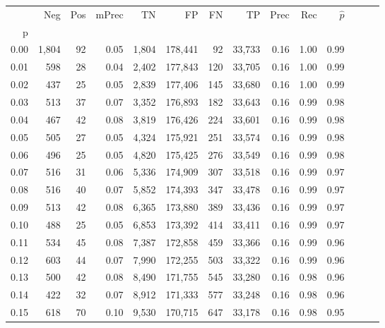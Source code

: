\begin{tabular}{rrrrrrrrrrrrrr}
\toprule
{} &    Neg &    Pos & mPrec &       TN &       FP &      FN &      TP &  Prec &   Rec & $\hat{p}$ \\
p    &        &        &       &          &          &         &         &       &       &           \\
\midrule
0.00 &  1,804 &     92 &  0.05 &    1,804 &  178,441 &      92 &  33,733 &  0.16 &  1.00 &      0.99 \\
0.01 &    598 &     28 &  0.04 &    2,402 &  177,843 &     120 &  33,705 &  0.16 &  1.00 &      0.99 \\
0.02 &    437 &     25 &  0.05 &    2,839 &  177,406 &     145 &  33,680 &  0.16 &  1.00 &      0.99 \\
0.03 &    513 &     37 &  0.07 &    3,352 &  176,893 &     182 &  33,643 &  0.16 &  0.99 &      0.98 \\
0.04 &    467 &     42 &  0.08 &    3,819 &  176,426 &     224 &  33,601 &  0.16 &  0.99 &      0.98 \\
0.05 &    505 &     27 &  0.05 &    4,324 &  175,921 &     251 &  33,574 &  0.16 &  0.99 &      0.98 \\
0.06 &    496 &     25 &  0.05 &    4,820 &  175,425 &     276 &  33,549 &  0.16 &  0.99 &      0.98 \\
0.07 &    516 &     31 &  0.06 &    5,336 &  174,909 &     307 &  33,518 &  0.16 &  0.99 &      0.97 \\
0.08 &    516 &     40 &  0.07 &    5,852 &  174,393 &     347 &  33,478 &  0.16 &  0.99 &      0.97 \\
0.09 &    513 &     42 &  0.08 &    6,365 &  173,880 &     389 &  33,436 &  0.16 &  0.99 &      0.97 \\
0.10 &    488 &     25 &  0.05 &    6,853 &  173,392 &     414 &  33,411 &  0.16 &  0.99 &      0.97 \\
0.11 &    534 &     45 &  0.08 &    7,387 &  172,858 &     459 &  33,366 &  0.16 &  0.99 &      0.96 \\
0.12 &    603 &     44 &  0.07 &    7,990 &  172,255 &     503 &  33,322 &  0.16 &  0.99 &      0.96 \\
0.13 &    500 &     42 &  0.08 &    8,490 &  171,755 &     545 &  33,280 &  0.16 &  0.98 &      0.96 \\
0.14 &    422 &     32 &  0.07 &    8,912 &  171,333 &     577 &  33,248 &  0.16 &  0.98 &      0.96 \\
0.15 &    618 &     70 &  0.10 &    9,530 &  170,715 &     647 &  33,178 &  0.16 &  0.98 &      0.95 \\

\end{tabular}

